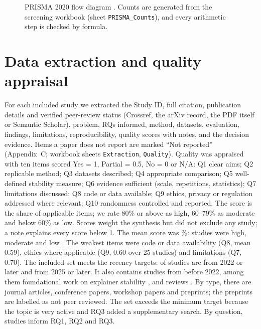 \begin{figure}[H]
{}
\caption{PRISMA 2020 flow diagram \cite{page2021}. Counts are generated from the screening workbook (sheet \texttt{PRISMA\_Counts}), and every arithmetic step is checked by formula.}\label{fig:prisma}
\end{figure}

\section{Data extraction and quality appraisal}
For each included study we extracted the Study ID, full citation, publication details and verified peer-review status (Crossref, the arXiv record, the PDF itself or Semantic Scholar), problem, RQs informed, method, datasets, evaluation, findings, limitations, reproducibility, quality scores with notes, and the decision evidence. Items a paper does not report are marked ``Not reported'' (Appendix~C; workbook sheets \texttt{Extraction}, \texttt{Quality}). Quality was appraised with ten items scored Yes = 1, Partial = 0.5, No = 0 or N/A: Q1 clear aims; Q2 replicable method; Q3 datasets described; Q4 appropriate comparison; Q5 well-defined stability measure; Q6 evidence sufficient (scale, repetitions, statistics); Q7 limitations discussed; Q8 code or data available; Q9 ethics, privacy or regulation addressed where relevant; Q10 randomness controlled and reported. The score is the share of applicable items; we rate 80\% or above as high, 60--79\% as moderate and below 60\% as low. Scores weight the synthesis but did not exclude any study; a note explains every score below 1. The mean score was \qaMean\%: \qaHigh{} studies were high, \qaMod{} moderate and \qaLow{} low \cite{S15,S55}. The weakest items were code or data availability (Q8, mean 0.59), ethics where applicable (Q9, 0.60 over 25 studies) and limitations (Q7, 0.70). The included set meets the recency targets: \incSinceTwentyTwo{} of \totalIncluded{} studies are from 2022 or later and \incSinceTwentyFive{} from 2025 or later. It also contains \incBeforeTwentyTwo{} studies from before 2022, among them foundational work on explainer stability \cite{S01,S04,S08}, and \mapreview{} reviews \evreview. By type, there are \incJournal{} journal articles, \incConference{} conference papers, \incWorkshop{} workshop papers and \incPreprint{} preprints; the preprints are labelled as not peer reviewed. The set exceeds the minimum target because the topic is very active and RQ3 added a supplementary search. By question, \rqOne{} studies inform RQ1, \rqTwo{} RQ2 and \rqThree{} RQ3.

